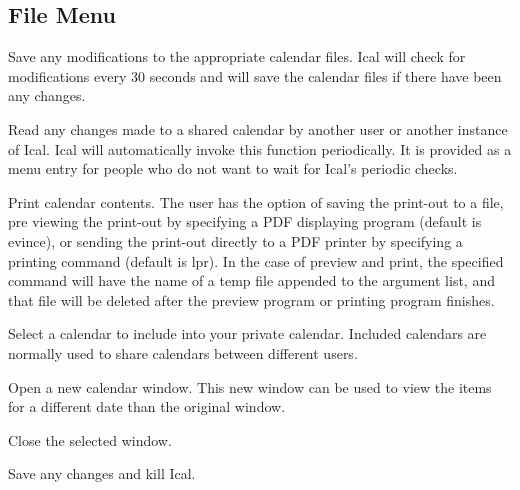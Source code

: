 \documentclass[a4paper,english]{article}
\begin{document}
    \subsection{File Menu}
        \begin{Description}\setlength{\itemsep}{0cm}
        \item[Save]
            Save any modifications to the appropriate calendar files.
            Ical will check for modifications every 30 seconds and will
            save the calendar files if there have been any changes.

        \item[Re-Read]
            Read any changes made to a shared calendar by another user
            or another instance of Ical.  Ical will automatically
            invoke this function periodically.  It is provided as a
            menu entry for people who do not want to wait for Ical's
            periodic checks.

        \item[Print]
            Print calendar contents.  The user has the option of
            saving the print-out to a file, pre viewing the print-out
            by specifying a PDF displaying program (default is
            evince), or sending the print-out directly to a PDF
            printer by specifying a printing command (default is
            lpr). In the case of preview and print, the specified
            command will have the name of a temp file appended to the
            argument list, and that file will be deleted after the
            preview program or printing program finishes.

        \item[Include Calendar]
            Select a calendar to include into your private calendar.
            Included calendars are normally used to share calendars
            between different users.

        \item[New Window]
            Open a new calendar window. This new window can be used to
            view the items for a different date than the original
            window.

        \item[Close Window]
            Close the selected window.

        \item[Exit]
            Save any changes and kill Ical.

        \end{Description}
\end{document}
